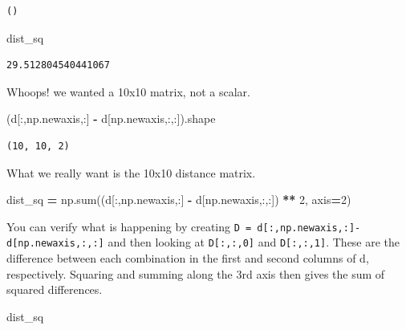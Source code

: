 \documentclass[
  letterpaper,
]{scrbook}
\newenvironment{Shaded}{\begin{snugshade}}{\end{snugshade}}
\newcommand{\BuiltInTok}[1]{#1}
\newcommand{\DecValTok}[1]{\textcolor[rgb]{0.00,0.00,0.81}{#1}}
\newcommand{\NormalTok}[1]{#1}
\newcommand{\OperatorTok}[1]{\textcolor[rgb]{0.81,0.36,0.00}{\textbf{#1}}}
\begin{document}
\begin{verbatim}
()
\end{verbatim}

\begin{Shaded}
\begin{Highlighting}[]
\NormalTok{dist_sq}
\end{Highlighting}
\end{Shaded}

\begin{verbatim}
29.512804540441067
\end{verbatim}

Whoops! we wanted a 10x10 matrix, not a scalar.

\begin{Shaded}
\begin{Highlighting}[]
\NormalTok{(d[:,np.newaxis,:] }\OperatorTok{-}\NormalTok{ d[np.newaxis,:,:]).shape}
\end{Highlighting}
\end{Shaded}

\begin{verbatim}
(10, 10, 2)
\end{verbatim}

What we really want is the 10x10 distance matrix.

\begin{Shaded}
\begin{Highlighting}[]
\NormalTok{dist_sq }\OperatorTok{=}\NormalTok{ np.}\BuiltInTok{sum}\NormalTok{((d[:,np.newaxis,:] }\OperatorTok{-}\NormalTok{ d[np.newaxis,:,:]) }\OperatorTok{**} \DecValTok{2}\NormalTok{, axis}\OperatorTok{=}\DecValTok{2}\NormalTok{)}
\end{Highlighting}
\end{Shaded}

You can verify what is happening by creating \texttt{D\ =\ d{[}:,np.newaxis,:{]}-d{[}np.newaxis,:,:{]}} and then looking at \texttt{D{[}:,:,0{]}} and \texttt{D{[}:,:,1{]}}. These are the difference between each combination in the first and second columns of d, respectively. Squaring and summing along the 3rd axis then gives the sum of squared differences.

\begin{Shaded}
\begin{Highlighting}[]
\NormalTok{dist_sq}
\end{Highlighting}
\end{Shaded}
\end{document}
